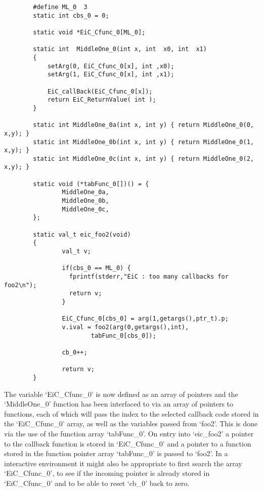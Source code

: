 \small
\begin{verbatim}
        #define ML_0  3
        static int cbs_0 = 0;

        static void *EiC_Cfunc_0[ML_0];

        static int  MiddleOne_0(int x, int  x0, int  x1)
        {
            setArg(0, EiC_Cfunc_0[x], int ,x0);
            setArg(1, EiC_Cfunc_0[x], int ,x1);
        
            EiC_callBack(EiC_Cfunc_0[x]);
            return EiC_ReturnValue( int );
        }
        
        static int MiddleOne_0a(int x, int y) { return MiddleOne_0(0, x,y); }
        static int MiddleOne_0b(int x, int y) { return MiddleOne_0(1, x,y); }
        static int MiddleOne_0c(int x, int y) { return MiddleOne_0(2, x,y); }

        static void (*tabFunc_0[])() = {
                MiddleOne_0a,
                MiddleOne_0b,
                MiddleOne_0c,
        };

        static val_t eic_foo2(void)
        {
                val_t v;
                
                if(cbs_0 == ML_0) {
                  fprintf(stderr,"EiC : too many callbacks for foo2\n");
                  return v;
                }

                EiC_Cfunc_0[cbs_0] = arg(1,getargs(),ptr_t).p;
                v.ival = foo2(arg(0,getargs(),int),
                        tabFunc_0[cbs_0]);

                cb_0++;
        
                return v;
        }
\end{verbatim}
\normalsize

The variable `EiC\_Cfunc\_0' is now defined as an array of pointers and
the `MiddleOne\_0' function has been interfaced to via an array of
pointers to functions, each of which will pass the index to the
selected callback code stored in the `EiC\_Cfunc\_0' array, as well as
the variables passed from `foo2'. This is done via the use of the
function array `tabFunc\_0'. On entry into `eic\_foo2' a pointer to the
callback function is stored in `EiC\_Cfunc\_0' and a pointer to a
function stored in the function pointer array `tabFunc\_0' is passed to
`foo2'.  In a interactive environment it might also be appropriate to
first search the array `EiC\_Cfunc\_0', to see if the incoming pointer
is already stored in `EiC\_Cfunc\_0' and to be able to reset `cb\_0' back
to zero.

